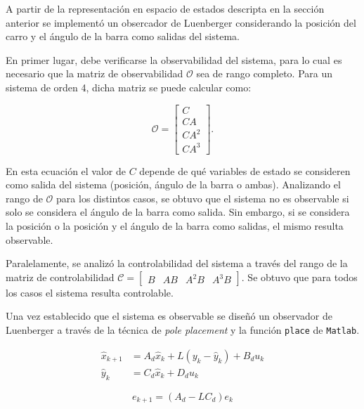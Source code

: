 A partir de la representación en espacio de estados descripta en la sección anterior se implementó un obsercador de Luenberger considerando la posición del carro y el ángulo de la barra como salidas del sistema. 

En primer lugar, debe verificarse la observabilidad del sistema, para lo cual es necesario que la matriz de observabilidad $\mathcal{O}$ sea de rango completo. Para un sistema de orden 4, dicha matriz se puede calcular como:

\begin{equation*}
    \mathcal{O} = 
    \begin{bmatrix}
        C \\
        CA \\ 
        CA^2 \\
        CA^3
    \end{bmatrix}.
\end{equation*}

En esta ecuación el valor de $C$ depende de qué variables de estado se consideren como salida del sistema (posición, ángulo de la barra o ambas). Analizando el rango de $\mathcal{O}$ para los distintos casos, se obtuvo que el sistema no es observable si solo se considera el ángulo de la barra como salida. Sin embargo, si se considera la posición o la posición y el ángulo de la barra como salidas, el mismo resulta observable.

Paralelamente, se analizó la controlabilidad del sistema a través del rango de la matriz de controlabilidad $\mathcal{C} = \begin{bmatrix}
    B & AB & A^2B & A^3B
\end{bmatrix}$. Se obtuvo que para todos los casos el sistema resulta controlable.

Una vez establecido que el sistema es observable se diseñó un observador de Luenberger a través de la técnica de \textit{pole placement} y la función \texttt{place} de \texttt{Matlab}.  

\begin{center}
\begin{minipage}{0.65\textwidth}
    \begin{subequations}
    \begin{align}
        \hat{x}_{k+1} &= A_d \hat{x}_k + L\left(y_k - \hat{y}_k\right) + B_d u_k 
        \label{eq:observador 1}
        \\
        \hat{y}_k &= C_d \hat{x}_k + D_d u_k
        \label{eq:observador 2}
    \end{align}
    \end{subequations}
\end{minipage}
\hfill
\begin{minipage}{0.30\textwidth}
\begin{equation}
e_{k+1} = \left(A_d - L C_d\right)e_k
\label{eq:error}
\end{equation}
\end{minipage}
\end{center}

